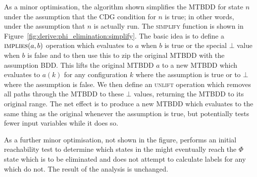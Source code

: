 
As a minor optimisation, the algorithm shown simplifies the MTBDD for
state $n$ under the assumption that the CDG condition for $n$ is true;
in other words, under the assumption that $n$ is actually run.  The
\textsc{simplify} function is shown in
Figure~\ref{fig:derive:phi_elimination:simplify}.  The basic idea is
to define a $\textsc{implies}(a, b)$ operation which evaluates to $a$
when $b$ is true or the special $\bot$ value when $b$ is false and to
then use this to zip the original MTBDD with the assumption BDD.  This
lifts the original MTBDD $a$ to a new MTBDD which evaluates to $a(k)$
for any configuration $k$ where the assumption is true or to $\bot$
where the assumption is false.  We then define an \textsc{unlift}
operation which removes all paths through the MTBDD to these $\bot$
values, returning the MTBDD to its original range.  The net effect is
to produce a new MTBDD which evaluates to the same thing as the
original whenever the assumption is true, but potentially tests fewer
input variables while it does so.


As a further minor optimisation, not shown in the figure,
{\implementation} performs an initial reachability test to determine
which states in the {\StateMachine} might eventually reach the $\Phi$
state which is to be eliminated and does not attempt to calculate
labels for any which do not.  The result of the analysis is unchanged.

